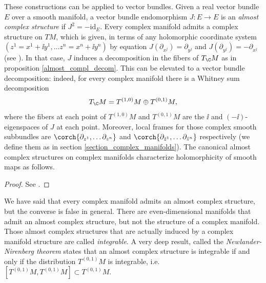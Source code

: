 These constructions can be applied to vector bundles. Given a real vector bundle \(E\) over a smooth manifold, a vector bundle endomorphism \(J \colon E \to E\) is an \textit{almost complex structure} if \(J^2=-\mathrm{id}_E\). Every complex manifold admits a complex structure on \(TM\), which is given, in terms of any holomorphic coordinate system \((z^1=x^1+\ii y^1, \ldots z^n=x^n+\ii y^n)\) by equation \(J(\partial_{x^j})=\partial_{y^j}\) and \(J(\partial_{y^j})=-\partial_{x^j}\) (see \parencite[Prop. 1.55]{lee_introCM}). In that case, \(J\) induces a decomposition in the fibers of \(T_\C M\) as in proposition \ref{almost_compl_decom}. This can be elevated to a vector bundle decomposition: indeed, for every complex manifold there is a Whitney sum decomposition
\begin{equation} \label{decomp_T_CM}
T_\C M= T^{(1,0)}M \oplus T^{(0,1)}M,
\end{equation}
where the fibers at each point of \( T^{(1,0)}M\) and \(T^{(0,1)}M\) are the \(\ii\) and \((-\ii)\)-eigenspaces of \(J\) at each point. Moreover, local frames for those complex smooth subbundles are \(\corch{\partial_{z^1}, \ldots \partial_{z^n}}\) and \(\corch{\partial_{\bar{z}^1}, \ldots \partial_{\bar{z}^n}}\) respectively (we define them as in section \ref{section_complex_manifolds}). The canonical almost complex structures on complex manifolds characterize holomorphicity of smooth maps as follows.

\begin{proof}
    See \parencite[Prop. 1.55]{lee_introCM}.
\end{proof}

We have said that every complex manifold admits an almost complex structure, but the converse is false in general. There are even-dimensional manifolds that admit an almost complex structure, but not the structure of a complex manifold. Those almost complex structures that are actually induced by a complex manifold structure are called \textit{integrable}. A very deep result, called the \textit{Newlander-Nirenberg theorem} states that an almost complex structure is integrable if and only if the distribution \(T^{(0,1)}M\) is integrable, i.e. \([T^{(0,1)}M, T^{(0,1)}M]\subset T^{(0,1)}M\).


